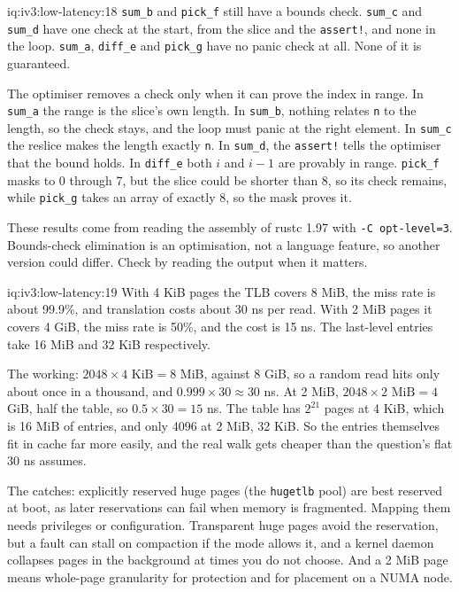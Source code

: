 \begin{solution}{iq:iv3:low-latency:18}
\texttt{sum\_b} and \texttt{pick\_f} still have a bounds check. \texttt{sum\_c} and \texttt{sum\_d} have one check at the start, from the slice and the \texttt{assert!}, and none in the loop. \texttt{sum\_a}, \texttt{diff\_e} and \texttt{pick\_g} have no panic check at all. None of it is guaranteed.

The optimiser removes a check only when it can prove the index in range. In \texttt{sum\_a} the range is the slice's own length. In \texttt{sum\_b}, nothing relates \texttt{n} to the length, so the check stays, and the loop must panic at the right element. In \texttt{sum\_c} the reslice makes the length exactly \texttt{n}. In \texttt{sum\_d}, the \texttt{assert!} tells the optimiser that the bound holds. In \texttt{diff\_e} both $i$ and $i - 1$ are provably in range. \texttt{pick\_f} masks to 0 through 7, but the slice could be shorter than 8, so its check remains, while \texttt{pick\_g} takes an array of exactly 8, so the mask proves it.

These results come from reading the assembly of rustc 1.97 with \texttt{-C opt-level=3}. Bounds-check elimination is an optimisation, not a language feature, so another version could differ. Check by reading the output when it matters.

\end{solution}

\begin{solution}{iq:iv3:low-latency:19}
With 4 KiB pages the TLB covers 8 MiB, the miss rate is about 99.9\%, and translation costs about 30 ns per read. With 2 MiB pages it covers 4 GiB, the miss rate is 50\%, and the cost is 15 ns. The last-level entries take 16 MiB and 32 KiB respectively.

The working: $2048 \times 4\text{ KiB} = 8$ MiB, against 8 GiB, so a random read hits only about once in a thousand, and $0.999 \times 30 \approx 30$ ns. At 2 MiB, $2048 \times 2\text{ MiB} = 4$ GiB, half the table, so $0.5 \times 30 = 15$ ns. The table has $2^{21}$ pages at 4 KiB, which is 16 MiB of entries, and only 4096 at 2 MiB, 32 KiB. So the entries themselves fit in cache far more easily, and the real walk gets cheaper than the question's flat 30 ns assumes.

The catches: explicitly reserved huge pages (the \texttt{hugetlb} pool) are best reserved at boot, as later reservations can fail when memory is fragmented. Mapping them needs privileges or configuration. Transparent huge pages avoid the reservation, but a fault can stall on compaction if the mode allows it, and a kernel daemon collapses pages in the background at times you do not choose. And a 2 MiB page means whole-page granularity for protection and for placement on a NUMA node.

\end{solution}

